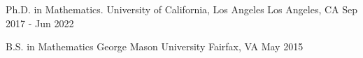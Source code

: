 
\vspace{0.2cm}
\begin{cventries}

  \cventryshort
    {Ph.D. in Mathematics. } %
    {University of California, Los Angeles} %
    {Los Angeles, CA} %
    {Sep 2017 - Jun 2022} %
    
  \cventryshort
    {B.S. in Mathematics} %
    {George Mason University} %
    {Fairfax, VA} %
    {May 2015} %
    
\end{cventries}
